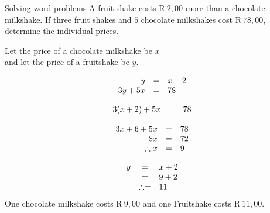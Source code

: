 \begin{wex}
{Solving word problems}
{
A fruit shake costs R$~2,00$ more than a chocolate milkshake. If three fruit shakes and $5$ chocolate milkshakes cost R$~78,00$, determine the individual prices.}

{
Let the price of a chocolate milkshake be $x$ 
\\ and let the price of a fruitshake be $y$.


\begin{equation*}
\begin{array}{ccl} \hfill y &=& x+2 \hfill \\
\hfill 3y+5x& =& 78\hfill 
\end{array}
\end{equation*}

\begin{equation*}
\begin{array}{ccl}\hfill 3(x+2)+5x& =& 78\hfill \\
\end{array}
\end{equation*}

\begin{equation*}
\begin{array}{ccl}
 \hfill 3x+6+5x& =& 78\hfill \\ 
\hfill 8x& =& 72\hfill \\ 
\hfill \therefore x& =& 9\hfill \\  \end{array}
\end{equation*}

\begin{equation*}
\begin{array}{ccl}
\hfill y& =& x+2\hfill \\
 \hfill & =& 9+2\hfill \\ 
\hfill & \therefore =& 11\hfill  \end{array}
\end{equation*}
One chocolate milkshake costs R$~9,00$ and one Fruitshake costs R$~ 11,00$.
}
\end{wex}

